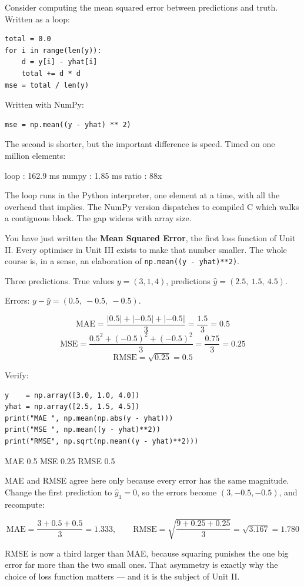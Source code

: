 \documentclass[11pt]{article}
\begin{document}
Consider computing the mean squared error between predictions and truth. Written
as a loop:

\begin{lstlisting}
total = 0.0
for i in range(len(y)):
    d = y[i] - yhat[i]
    total += d * d
mse = total / len(y)
\end{lstlisting}

Written with NumPy:

\begin{lstlisting}
mse = np.mean((y - yhat) ** 2)
\end{lstlisting}

The second is shorter, but the important difference is speed. Timed on one
million elements:

\begin{codeout}
loop  :    162.9 ms
numpy :      1.85 ms
ratio :       88x
\end{codeout}

The loop runs in the Python interpreter, one element at a time, with all the
overhead that implies. The NumPy version dispatches to compiled C which walks a
contiguous block. The gap widens with array size.

\begin{keyidea}
You have just written the \textbf{Mean Squared Error}, the first loss function
of Unit II. Every optimiser in Unit III exists to make that number smaller. The
whole course is, in a sense, an elaboration of \texttt{np.mean((y - yhat)**2)}.
\end{keyidea}

\begin{worked}
Three predictions. True values $y = (3, 1, 4)$, predictions
$\hat{y} = (2.5,\ 1.5,\ 4.5)$.

Errors: $y - \hat{y} = (0.5,\ -0.5,\ -0.5)$.

\[
\text{MAE} = \frac{|0.5| + |{-0.5}| + |{-0.5}|}{3} = \frac{1.5}{3} = 0.5
\]
\[
\text{MSE} = \frac{0.5^2 + (-0.5)^2 + (-0.5)^2}{3} = \frac{0.75}{3} = 0.25
\]
\[
\text{RMSE} = \sqrt{0.25} = 0.5
\]

Verify:
\begin{lstlisting}
y    = np.array([3.0, 1.0, 4.0])
yhat = np.array([2.5, 1.5, 4.5])
print("MAE ", np.mean(np.abs(y - yhat)))
print("MSE ", np.mean((y - yhat)**2))
print("RMSE", np.sqrt(np.mean((y - yhat)**2)))
\end{lstlisting}
\begin{codeout}
MAE  0.5
MSE  0.25
RMSE 0.5
\end{codeout}

MAE and RMSE agree here only because every error has the same magnitude. Change
the first prediction to $\hat{y}_1 = 0$, so the errors become $(3, -0.5, -0.5)$,
and recompute:

\[
\text{MAE} = \frac{3 + 0.5 + 0.5}{3} = 1.333,
\qquad
\text{RMSE} = \sqrt{\frac{9 + 0.25 + 0.25}{3}} = \sqrt{3.167} = 1.780
\]

RMSE is now a third larger than MAE, because squaring punishes the one big error
far more than the two small ones. That asymmetry is exactly why the choice of
loss function matters --- and it is the subject of Unit II.
\end{worked}
\end{document}
